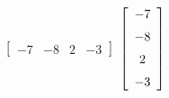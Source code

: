 {$\left[ \begin {array}{cccc} -7&-8&2&-3\end {array} \right]$ }
{$ \left[ \begin {array}{c} -7\\\noalign{\medskip}-8\\\noalign{\medskip}
2\\\noalign{\medskip}-3\end {array} \right] $}



